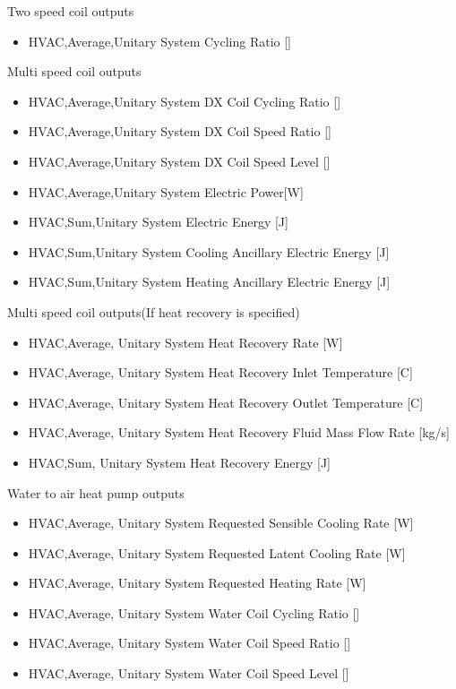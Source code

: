 Two speed coil outputs

\begin{itemize}
\tightlist
\item
  HVAC,Average,Unitary System Cycling Ratio {[]}
\end{itemize}

Multi speed coil outputs

\begin{itemize}
\item
  HVAC,Average,Unitary System DX Coil Cycling Ratio {[]}
\item
  HVAC,Average,Unitary System DX Coil Speed Ratio {[]}
\item
  HVAC,Average,Unitary System DX Coil Speed Level {[]}
\item
  HVAC,Average,Unitary System Electric Power{[}W{]}
\item
  HVAC,Sum,Unitary System Electric Energy {[}J{]}
\item
  HVAC,Sum,Unitary System Cooling Ancillary Electric Energy {[}J{]}
\item
  HVAC,Sum,Unitary System Heating Ancillary Electric Energy {[}J{]}
\end{itemize}

Multi speed coil outputs(If heat recovery is specified)

\begin{itemize}
\item
  HVAC,Average, Unitary System Heat Recovery Rate {[}W{]}
\item
  HVAC,Average, Unitary System Heat Recovery Inlet Temperature {[}C{]}
\item
  HVAC,Average, Unitary System Heat Recovery Outlet Temperature {[}C{]}
\item
  HVAC,Average, Unitary System Heat Recovery Fluid Mass Flow Rate {[}kg/s{]}
\item
  HVAC,Sum, Unitary System Heat Recovery Energy {[}J{]}
\end{itemize}

Water to air heat pump outputs

\begin{itemize}
\item
  HVAC,Average, Unitary System Requested Sensible Cooling Rate {[}W{]}
\item
  HVAC,Average, Unitary System Requested Latent Cooling Rate {[}W{]}
\item
  HVAC,Average, Unitary System Requested Heating Rate {[}W{]}
\item
  HVAC,Average, Unitary System Water Coil Cycling Ratio {[]}
\item
  HVAC,Average, Unitary System Water Coil Speed Ratio {[]}
\item
  HVAC,Average, Unitary System Water Coil Speed Level {[]}
\end{itemize}


